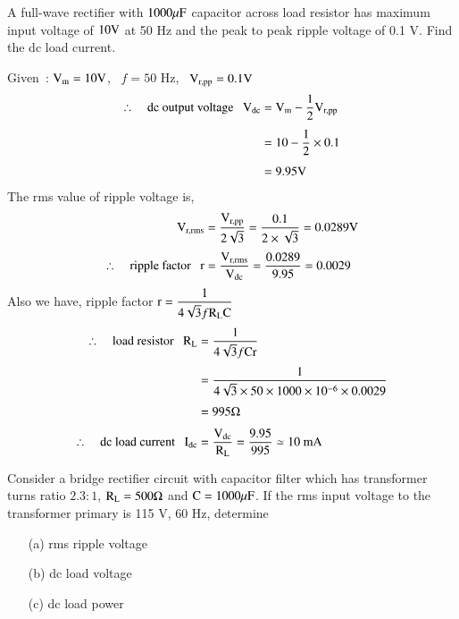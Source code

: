 \begin{problem}\label{prob1.21}
A full-wave rectifier with $1000\mu\textrm{F}$ capacitor across load resistor has maximum input voltage of $10\textrm{V}$ at 50 Hz and the peak to peak ripple voltage of 0.1 V. Find the dc load current.
\end{problem}

\begin{solution}
Given~: $\textrm{V}_{\textrm{m}}=10\textrm{V}$, \ $f=50$ Hz, \ $\textrm{V}_{\text{r,pp}}=0.1\textrm{V}$
\begin{align*}
\therefore\quad \text{dc output voltage~~ } \textrm{V}_{\text{dc}} &= \textrm{V}_{\textrm{m}}-\frac{1}{2}\textrm{V}_{\text{r,pp}}\\[4pt]
&= 10-\frac{1}{2}\times 0.1\\[4pt]
&= 9.95\textrm{V}
\end{align*}
The rms value of ripple voltage is,
\begin{align*}
\textrm{V}_{\text{r,rms}} &= \frac{\textrm{V}_{\text{r,pp}}}{2\sqrt{3}}=\dfrac{0.1}{2\times \sqrt{3}}=0.0289\textrm{V}\\[3pt]
\therefore\quad \text{ripple factor~~ } \textrm{r} &= \frac{\textrm{V}_{\text{r,rms}}}{\textrm{V}_{\text{dc}}}=\dfrac{0.0289}{9.95}=0.0029
\end{align*}
Also we have, ripple factor $\textrm{r}=\dfrac{1}{4\sqrt{3}f\textrm{R}_{\textrm{L}}\textrm{C}}$
\begin{align*}
\therefore\quad \text{load resistor~~ } \textrm{R}_{\textrm{L}} &= \frac{1}{4\sqrt{3}f\textrm{C}\textrm{r}}\\[3pt]
&= \frac{1}{4\sqrt{3}\times 50\times 1000\times 10^{-6}\times 0.0029}\\[3pt]
&= 995\Omega\\[3pt]
\therefore\quad \text{dc load current~~ } \textrm{I}_{\text{dc}} &= \frac{\textrm{V}_{\text{dc}}}{\textrm{R}_{\textrm{L}}}=\dfrac{9.95}{995}\simeq 10\text{~mA}
\end{align*}
\end{solution}

\begin{problem}\label{prob1.22}
Consider a bridge rectifier circuit with capacitor filter which has transformer turns ratio $2.3:1$, $\textrm{R}_{\textrm{L}}=500\Omega$ and $\textrm{C}=1000\mu\textrm{F}$. If the rms input voltage to the transformer primary is 115 V, 60 Hz, determine
\begin{itemize}
\item[(a)] rms ripple voltage

\item[(b)] dc load voltage

\item[(c)] dc load power
\end{itemize}
\end{problem}

